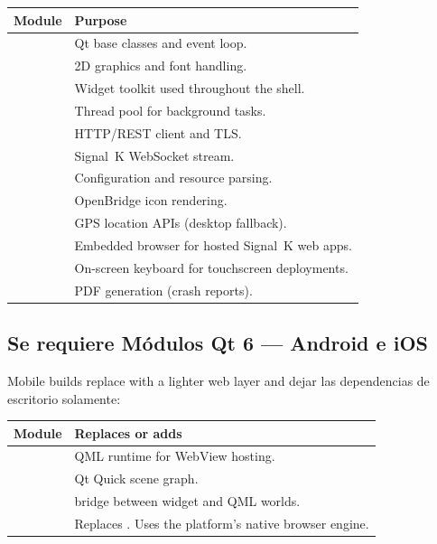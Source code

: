 \begin{longtable}{L{4.5cm}L{9.2cm}}
\toprule
{}
\color{white}\sffamily\bfseries Module &
\color{white}\sffamily\bfseries Purpose \\
\midrule
{}            & Qt base classes and event loop. \\
             & 2D graphics and font handling. \\
         & Widget toolkit used throughout the shell. \\
      & Thread pool for background tasks. \\
         & HTTP/REST client and TLS. \\
      & Signal~K WebSocket stream. \\
             & Configuration and resource parsing. \\
             & OpenBridge icon rendering. \\
     & GPS location APIs (desktop fallback). \\
& Embedded browser for hosted Signal~K web apps. \\
 & On-screen keyboard for touchscreen deployments. \\
    & PDF generation (crash reports). \\
\bottomrule
\end{longtable}

\subsection{Se requiere Módulos Qt 6 --- Android e iOS}

Mobile builds replace  with a lighter web layer and
dejar las dependencias de escritorio solamente:

\begin{longtable}{L{4.5cm}L{9.2cm}}
\toprule
{}
\color{white}\sffamily\bfseries Module &
\color{white}\sffamily\bfseries Replaces or adds \\
\midrule
{}         & QML runtime for WebView hosting. \\
       & Qt Quick scene graph. \\
&  bridge between widget and QML worlds. \\
     & Replaces . Uses the platform's native browser engine. \\
\bottomrule
\end{longtable}

